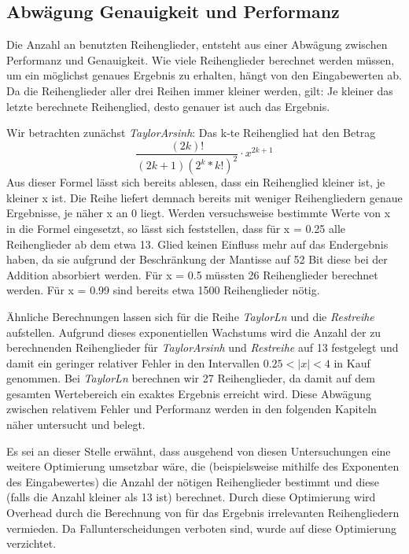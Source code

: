 \documentclass[course=erap] {aspdoc}
\begin{document}
    \subsection{Abwägung Genauigkeit und Performanz}
    Die Anzahl an benutzten Reihenglieder, entsteht aus einer Abwägung zwischen Performanz und Genauigkeit.
    Wie viele Reihenglieder berechnet werden müssen, um ein möglichst genaues Ergebnis zu erhalten, hängt von den Eingabewerten ab.
    Da die Reihenglieder aller drei Reihen immer kleiner werden, gilt: Je kleiner das letzte berechnete Reihenglied, desto genauer ist auch das Ergebnis.


    Wir betrachten zunächst \textit{TaylorArsinh}:
    Das k-te Reihenglied hat den Betrag
    \[
        \frac{(2k)!}{(2k + 1)(2^k*k!)^2}\cdot x^{2k+1}
    \]
    Aus dieser Formel lässt sich bereits ablesen, dass ein Reihenglied kleiner ist, je kleiner x ist.
    Die Reihe liefert demnach bereits mit weniger Reihengliedern genaue Ergebnisse, je näher x an 0 liegt.
    Werden versuchsweise bestimmte Werte von x in die Formel eingesetzt, so lässt sich feststellen, dass für x = 0.25 alle Reihenglieder ab dem etwa 13. Glied keinen Einfluss mehr auf das Endergebnis haben, da sie aufgrund der Beschränkung der Mantisse auf 52 Bit diese bei der Addition absorbiert werden.
    Für x = 0.5 müssten 26 Reihenglieder berechnet werden.
    Für x = 0.99 sind bereits etwa 1500 Reihenglieder nötig.
    
    Ähnliche Berechnungen lassen sich für die Reihe \textit{TaylorLn} und die \textit{Restreihe} aufstellen. Aufgrund dieses exponentiellen Wachstums wird die Anzahl der zu berechnenden Reihenglieder für \textit{TaylorArsinh} und \textit{Restreihe} auf 13 festgelegt und damit ein geringer relativer Fehler in den Intervallen $0.25<|x|<4$ in Kauf genommen. Bei \textit{TaylorLn} berechnen wir 27 Reihenglieder, da damit auf dem gesamten Wertebereich ein exaktes Ergebnis erreicht wird.
    Diese Abwägung zwischen relativem Fehler und Performanz werden in den folgenden Kapiteln näher untersucht und belegt.

    Es sei an dieser Stelle erwähnt, dass ausgehend von diesen Untersuchungen eine weitere Optimierung umsetzbar wäre, die (beispielsweise mithilfe des Exponenten des Eingabewertes) die Anzahl der nötigen Reihenglieder bestimmt und diese (falls die Anzahl kleiner als 13 ist) berechnet.
    Durch diese Optimierung wird Overhead durch die Berechnung von für das Ergebnis irrelevanten Reihengliedern vermieden.
    Da Fallunterscheidungen verboten sind, wurde auf diese Optimierung verzichtet.
\end{document}
